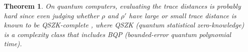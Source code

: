 \documentclass[
aps,
pra,
floatfix,
]{revtex4-2}
\theoremstyle{plain}
\newtheorem{theorem}{Theorem}
\theoremstyle{definition}
\newcommand{\dm}{\rho}
\begin{document}
\begin{theorem}
	On quantum computers, evaluating the trace distances is probably hard since even judging whether $\dm$ and $\dm'$ have large or small trace distance is known to be QSZK-complete \cite{watrousQuantumComputationalComplexity2008}, where QSZK (quantum statistical zero-knowledge) is a complexity class that includes BQP (bounded-error quantum polynomial time).
\cite{chenVariationalQuantumAlgorithms2022}
\end{theorem}


\end{document}
